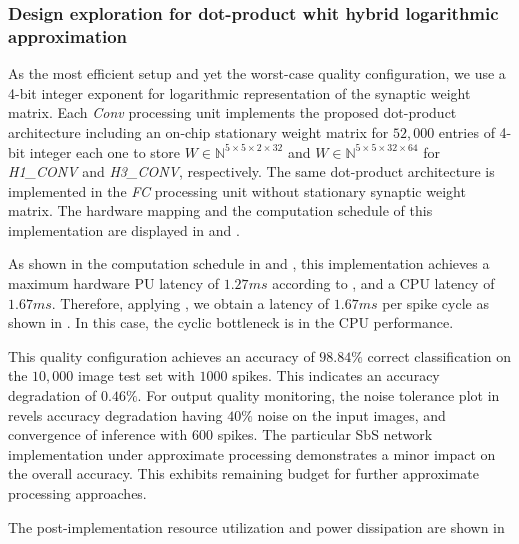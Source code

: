 \subsubsection{Design exploration for dot-product whit hybrid logarithmic approximation}
As the most efficient setup and yet the worst-case quality configuration, we use a 4-bit integer exponent for logarithmic representation of the synaptic weight matrix. Each \emph{Conv} processing unit implements the proposed dot-product architecture including an on-chip stationary weight matrix for $52,000$ entries of 4-bit integer each one to store $W\in\mathbb{N}^{5\times 5\times 2\times 32}$ and $W\in\mathbb{N}^{5\times 5\times 32\times 64}$ for \emph{H1\_CONV} and \emph{H3\_CONV}, respectively. The same dot-product architecture is implemented in the \emph{FC} processing unit without stationary synaptic weight matrix. The hardware mapping and the computation schedule of this implementation are displayed in  and .

As shown in the computation schedule in  and , this implementation achieves a maximum hardware PU latency of $1.27 ms$ according to , and a CPU latency of $1.67 ms$. Therefore, applying , we obtain a latency of $1.67 ms$ per spike cycle as shown in . In this case, the cyclic bottleneck is in the CPU performance.

This quality configuration achieves an accuracy of $98.84\%$ correct classification on the $10,000$ image test set with $1000$ spikes. This indicates an accuracy degradation of $0.46\%$. For output quality monitoring, the noise tolerance plot in  revels accuracy degradation having $40\%$ noise on the input images, and convergence of inference with $600$ spikes. The particular SbS network implementation under approximate processing demonstrates a minor impact on the overall accuracy. This exhibits remaining budget for further approximate processing approaches.

The post-implementation resource utilization and power dissipation  are shown in  

